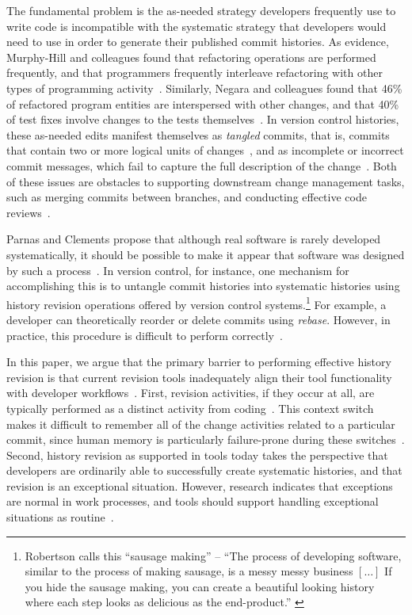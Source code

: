\documentclass[conference]{IEEEtran}
\newcommand{\purpose}[1]{}
\begin{document}
\purpose{Problem is that strategies are incompatible.} 
The fundamental problem is the as-needed strategy developers frequently use to write code is incompatible with 
the systematic strategy that developers would need to use in order to generate their published commit histories. 
As evidence, Murphy-Hill and colleagues found that refactoring operations are performed frequently, and that programmers 
frequently interleave refactoring with other types of programming activity~\cite{Murphy-Hill2012c}. 
Similarly, Negara and colleagues found that 46\% of refactored program entities are interspersed with other changes, and that 40\% of test fixes involve changes to the tests themselves~\cite{Negara2012}. 
In version control histories, these as-needed edits manifest themselves as \emph{tangled} commits, that is, commits that contain two or more logical units of changes~\cite{Kirinuki2014}, and as incomplete or incorrect commit messages, which fail to capture the full description of the change~\cite{Buse2010,Murphy-Hill2012c}. 
Both of these issues are obstacles to supporting downstream change management tasks, such as merging commits between branches, and conducting effective code reviews~\cite{Kirinuki2014}.

\purpose{History revision gets out of this conflict} 
Parnas and Clements propose that although real software is rarely developed systematically, it should be possible to make it appear that software was designed by such a process~\cite{Parnas1986}. In version control, for instance, one mechanism for accomplishing this is to untangle commit histories into systematic histories using history revision operations offered by version control systems.\footnote{Robertson calls this ``sausage making'' -- ``The process of developing software, 
similar to the process of making sausage, is a messy messy business $[\ldots]$ If you hide the sausage making, 
you can create a beautiful looking history where each step looks as delicious as the end-product.'' 
\cite{SausageMaking}}
For example, a developer can theoretically reorder or delete commits using \textit{rebase}.
However, in practice, this procedure is difficult to perform correctly~\cite{SausageMaking}.

\purpose{History revisions are not properly supported by tools} 
In this paper, we argue that the primary barrier to performing effective history revision is that current revision tools inadequately align their tool 
functionality with developer workflows~\cite{PerezDeRosso2013}.
First, revision activities, if they occur at all, are typically performed as a distinct activity from coding~\cite{Perry1989}. 
This context switch makes it difficult to remember all of the change activities related to a particular commit, 
since human memory is particularly failure-prone during these switches~\cite{Parnin2012}. 
Second, history revision as supported in tools today takes the perspective that 
developers are ordinarily able to successfully create systematic histories, and that revision is an exceptional situation. However, research indicates that exceptions are normal in work processes, and tools should support handling 
exceptional situations as routine~\cite{Ackerman2000}.
\end{document}
